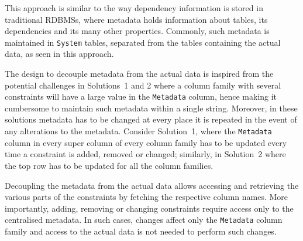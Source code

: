 This approach is similar to the way dependency information is
stored in traditional \acp{RDBMS},   where metadata holds information
about tables,   its dependencies and its many other properties.   Commonly,   such
metadata is maintained in \texttt{System} tables,  separated from the
tables containing the actual data,  as seen in this approach.   

The design to decouple metadata from the actual data is inspired from the
potential challenges in Solutions~1 and 2 where
a column family with several constraints will have a
large value in the \texttt{Metadata} column,  hence making it cumbersome to
maintain such metadata within a single string. 
Moreover,  in these solutions metadata has to be changed at every place it is repeated in the event of any alterations to
the metadata.  
Consider Solution~1,  where the \texttt{Metadata} column in every super column
of every column family has to be updated every time a constraint is added,  
removed or changed; similarly,  in Solution~2 where the top row has to be updated
for all the column families. 

Decoupling the metadata from the actual data allows accessing and retrieving the
various parts of the constraints by fetching  the respective column names. 
More importantly,   adding,  removing or changing constraints require  access only
to the centralised metadata.  In such cases,  changes affect only the
\texttt{Metadata} column family and access to the  actual data is not needed to
perform such changes. 









